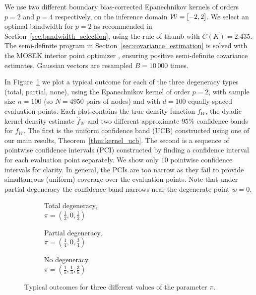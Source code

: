 We use two different boundary bias-corrected
Epanechnikov kernels of orders $p=2$ and $p=4$ respectively,
on the inference domain $\mathcal{W} = [-2,2]$.
We select an optimal bandwidth for $p=2$ as recommended in
Section~\ref{sec:bandwidth_selection},
using the rule-of-thumb with $C(K) = 2.435$.
The semi-definite program in Section~\ref{sec:covariance_estimation}
is solved with the MOSEK interior point optimizer \citep{mosek},
ensuring positive semi-definite covariance estimates.
Gaussian vectors are resampled
$B = 10\,000$ times.

In Figure~\ref{fig:results} we plot a typical outcome
for each of the three degeneracy types (total, partial, none),
using the Epanechnikov kernel of order $p=2$,
with sample size $n=100$
(so $N=4950$ pairs of nodes)
and with $d=100$ equally-spaced evaluation points.
Each plot contains the true density function $f_W$,
the dyadic kernel density estimate $\widehat f_W$
and two different approximate $95\%$ confidence bands for $f_W$.
The first is the uniform confidence band (UCB)
constructed using one of our main results, Theorem~\ref{thm:kernel_ucb}.
The second is a sequence of pointwise confidence intervals (PCI)
constructed by finding a confidence interval for
each evaluation point separately.
We show only $10$ pointwise confidence intervals for clarity.
In general, the PCIs are too narrow as they fail to
provide simultaneous (uniform) coverage over the evaluation points.
Note that
under partial degeneracy the confidence band narrows near the
degenerate point $w = 0$.

\begin{figure}[ht]
  \centering
  \begin{subfigure}{0.32\textwidth}
    \centering
    \caption{
      Total degeneracy, \\
      $\pi = \left( \frac{1}{2}, 0, \frac{1}{2} \right)$
    }
  \end{subfigure}
  \begin{subfigure}{0.32\textwidth}
    \centering
    \caption{
      Partial degeneracy, \\
      $\pi = \left( \frac{1}{4}, 0, \frac{3}{4} \right)$
    }
  \end{subfigure}
  \begin{subfigure}{0.32\textwidth}
    \centering
    \caption{
      No degeneracy, \\
      $\pi = \left( \frac{1}{5}, \frac{1}{5}, \frac{3}{5} \right)$
    }
  \end{subfigure}
  \caption{
    Typical outcomes for three different values of the parameter $\pi$.
  }
  \label{fig:results}
  \vspace{-.8em}
\end{figure}

